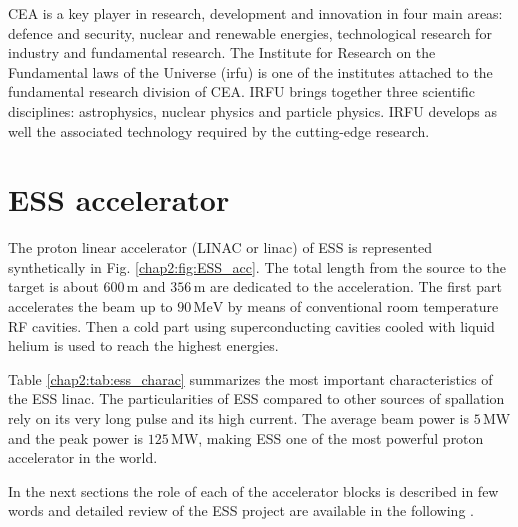 \begin{refsection}
  CEA is a key player in research, development and innovation in four main areas: defence and security, nuclear and renewable energies, technological research for industry and fundamental research. The Institute for Research on the Fundamental laws of the Universe (\acrshort{irfu}) is one of the institutes attached to the fundamental research division of CEA. IRFU brings together three scientific disciplines: astrophysics, nuclear physics and particle physics. IRFU develops as well the associated technology required by the cutting-edge research.


  \section{ESS accelerator}
  The proton linear accelerator (LINAC or linac) of ESS is represented synthetically in Fig. \ref{chap2:fig:ESS_acc}.
  The total length from the source to the target is about $600\,\mathrm{m}$ and $356\,\mathrm{m}$ are dedicated to the acceleration. The first part accelerates the beam up to $90\,\mathrm{MeV}$ by means of conventional room temperature RF cavities. Then a cold part using superconducting cavities cooled with liquid helium is used to reach the highest energies.

  

  Table \ref{chap2:tab:ess_charac} summarizes the most important characteristics of the ESS linac. The particularities of ESS compared to other sources of spallation rely on its very long pulse and its high current. The average beam power is $5\,\mathrm{MW}$ and the peak power is $125\,\mathrm{MW}$, making ESS one of the most powerful proton accelerator in the world.

  

  In the next sections the role of each of the accelerator blocks is described in few words and detailed review of the ESS project are available in the following \cite{Peggs2013, Garoby2017}.


\end{refsection}
